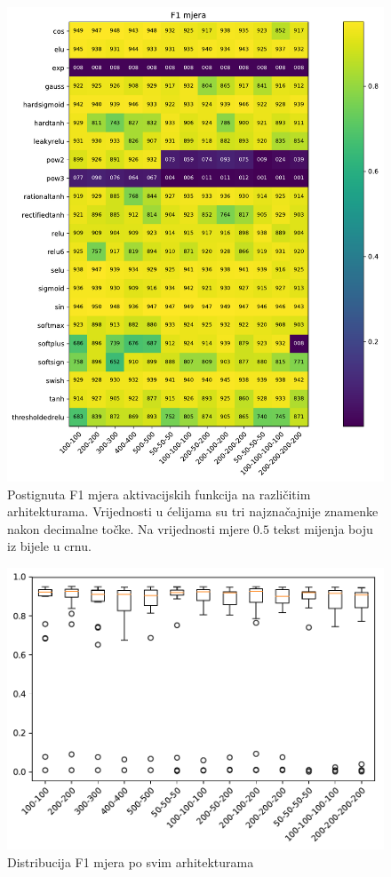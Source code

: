 \documentclass[times, utf8, numeric, diplomski]{fer}
\begin{document}
\begin{figure}[H]
\includegraphics[width=\textwidth]{greedy_9_f1.pdf}
\centering
\caption{Postignuta F1 mjera aktivacijskih funkcija na različitim arhitekturama. Vrijednosti u ćelijama su tri najznačajnije znamenke nakon decimalne točke. Na vrijednosti mjere $0.5$ tekst mijenja boju iz bijele u crnu.}
\label{fig:greedy_9_f1}
\end{figure}

\begin{figure}[H]
\includegraphics[width=\textwidth]{greedy_9_arch_quality.pdf}
\centering
\caption{Distribucija F1 mjera po svim arhitekturama}
\label{fig:greedy_9_arch_quality}
\end{figure}
\end{document}
